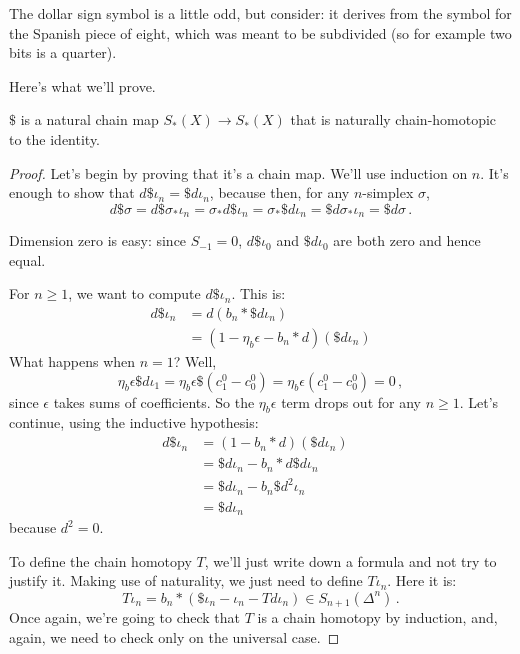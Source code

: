 The dollar sign symbol is a little odd, but consider: it derives from the
symbol for the Spanish piece of eight, which was meant to be subdivided 
(so for example two bits is a quarter). 

Here's what we'll prove.
\begin{prop}
$\$$ is a natural chain map $S_\ast(X)\to S_\ast(X)$ that is naturally chain-homotopic to the identity. 
\end{prop}

\noindent
\begin{proof}
Let's begin by proving that it's a chain map. We'll use induction on $n$. It's enough to show that $d\$\iota_n=\$ d\iota_n$, because then, for any $n$-simplex $\sigma$,
$$
d\$\sigma=d\$\sigma_\ast\iota_n=\sigma_\ast d\$\iota_n=\sigma_\ast \$d\iota_n=\$ d\sigma_\ast\iota_n=\$ d\sigma\,.
$$

Dimension zero is easy:
since $S_{-1}=0$, $d\$\iota_0$ and $\$d\iota_0$ are both zero and hence equal.

For $n\geq 1$, we want to compute $d\$\iota_n$. This is:
\begin{align*}
d\$\iota_n & =d(b_n\ast \$ d\iota_n)  \\
 & = (1-\eta_b\epsilon-b_n\ast d)(\$ d\iota_n)
\end{align*}
What happens when $n=1$? Well,
$$
\eta_b\epsilon\$d\iota_1 = \eta_b\epsilon \$(c^0_1 - c^0_0)=\eta_b\epsilon(c^0_1 - c^0_0)=0\,,
$$
since $\epsilon$ takes sums of coefficients. So the $\eta_b\epsilon$ term drops out for any $n\geq1$. Let's continue, using the inductive hypothesis:
\begin{align*}
d\$\iota_n & = (1 - b_n\ast d)(\$ d\iota_n) \\
 & = \$d\iota_n - b_n\ast d\$ d\iota_n  \\
 & = \$d\iota_n - b_n\$d^2\iota_n &\\
 & = \$d\iota_n 
\end{align*}
because $d^2=0$. 

To define the chain homotopy $T$, we'll just write down a formula and not try to justify it. Making use of naturality, we just need to define $T\iota_n$. 
Here it is:
\[
T\iota_n = b_n\ast(\$\iota_n - \iota_n - Td\iota_n)\in S_{n+1}(\Delta^n) \,.
\]
Once again, we're going to check that $T$ is a chain homotopy by induction, and, again, we need to check only on the universal case.


\end{proof}
